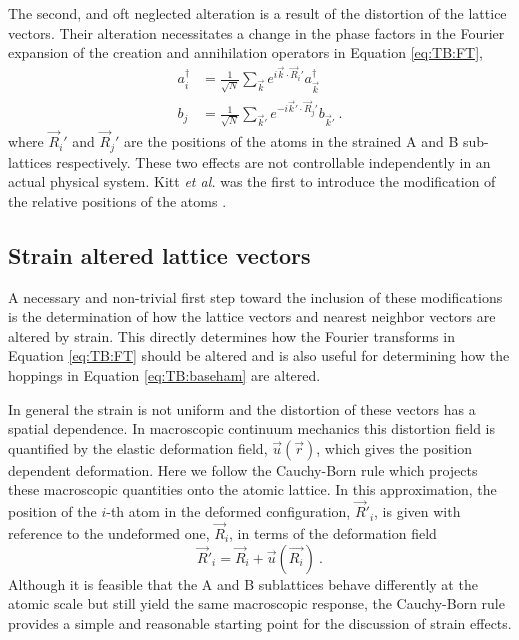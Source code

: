 The second, and oft neglected alteration is a result of the distortion of the lattice vectors.
Their alteration necessitates a change in the phase factors in the Fourier expansion of the creation and annihilation operators in Equation \ref{eq:TB:FT},
\begin{align}
  a_i^{\dagger}&=\frac{1}{\sqrt{N}}\sum_{\vec{k} } e^{ i \vec{k}  \cdot \vec{R}_i'} a_{\vec{k} }^{\dagger} \nonumber \\
  b_j          &=\frac{1}{\sqrt{N}}\sum_{\vec{k}'} e^{-i \vec{k}' \cdot \vec{R}_j'} b_{\vec{k}'} \ . \label{eq:PVP:FT} 
\end{align}
where $\vec{R}_i'$ and $\vec{R}_j'$ are the positions of the atoms in the strained A and B sub-lattices respectively.
These two effects are not controllable independently in an actual physical system.
Kitt \textit{et al.} was the first to introduce the modification of the relative positions of the atoms \cite{Kitt2012}.

\subsection{Strain altered lattice vectors}
A necessary and non-trivial first step toward the inclusion of these modifications is the determination of how the lattice vectors and nearest neighbor vectors are altered by strain.
This directly determines how the Fourier transforms in Equation \ref{eq:TB:FT} should be altered and is also useful for determining how the hoppings in Equation \ref{eq:TB:baseham} are altered.

In general the strain is not uniform and the distortion of these vectors has a spatial dependence.
In macroscopic continuum mechanics this distortion field is quantified by the elastic deformation field, $\vec{u}(\vec{r})$, which gives the position dependent deformation.
Here we follow the Cauchy-Born rule which projects these macroscopic quantities onto the atomic lattice.
In this approximation, the position of the $i$-th atom in the deformed configuration, $\vec{R}'_i$, is given with reference to the undeformed one, $\vec{R}_i$, in terms of the deformation field
\begin{equation*}
  \vec{R}'_{i}=\vec{R}_{i}+\vec{u}(\vec{R_i}) \ .
\end{equation*}
Although it is feasible that the A and B sublattices behave differently at the atomic scale but still yield the same macroscopic response, the Cauchy-Born rule provides a simple and reasonable starting point for the discussion of strain effects.

